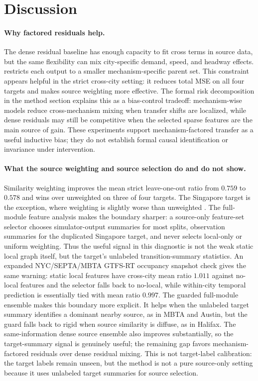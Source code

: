 \section{Discussion}

\paragraph{Why factored residuals help.}
The dense residual baseline has enough capacity to fit cross terms in source data, but the same flexibility can mix city-specific demand, speed, and headway effects.
\ours restricts each output to a smaller mechanism-specific parent set.
This constraint appears helpful in the strict cross-city setting: it reduces total MSE on all four targets and makes source weighting more effective.
The formal risk decomposition in the method section explains this as a bias-control tradeoff: mechanism-wise models reduce cross-mechanism mixing when transfer shifts are localized, while dense residuals may still be competitive when the selected sparse features are the main source of gain.
These experiments support mechanism-factored transfer as a useful inductive bias; they do not establish formal causal identification or invariance under intervention.

\paragraph{What the source weighting and source selection do and do not show.}
Similarity weighting improves the mean strict leave-one-out ratio from $0.759$ to $0.578$ and wins over unweighted \ours on three of four targets.
The Singapore target is the exception, where weighting is slightly worse than unweighted \ours.
The full-module feature analysis makes the boundary sharper: a source-only feature-set selector chooses simulator-output summaries for most splits, observation summaries for the duplicated Singapore target, and never selects local-only or uniform weighting.
Thus the useful signal in this diagnostic is not the weak static local graph itself, but the target's unlabeled transition-summary statistics.
An expanded NYC/SEPTA/MBTA GTFS-RT occupancy snapshot check gives the same warning: static local features have cross-city mean ratio $1.011$ against no-local features and the selector falls back to no-local, while within-city temporal prediction is essentially tied with mean ratio $0.997$.
The guarded full-module ensemble makes this boundary more explicit.
It helps when the unlabeled target summary identifies a dominant nearby source, as in MBTA and Austin, but the guard falls back to rigid \ours when source similarity is diffuse, as in Halifax.
The same-information dense \Htwo source ensemble also improves substantially, so the target-summary signal is genuinely useful; the remaining gap favors mechanism-factored residuals over dense residual mixing.
This is not target-label calibration: the target labels remain unseen, but the method is not a pure source-only setting because it uses unlabeled target summaries for source selection.

